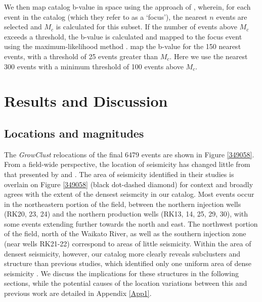 We then map catalog b-value in space using the approach of \citet{Bachmann_2012}, wherein, for each event in the catalog (which they refer to as a `focus'), the nearest $n$ events are selected and $M_c$ is calculated for this subset. If the number of events above $M_c$ exceeds a threshold, the b-value is calculated and mapped to the focus event using the maximum-likelihood method \citep{aki1965maximum,shi1982standard}. \citet{Bachmann_2012} map the b-value for the 150 nearest events, with a threshold of 25 events greater than $M_c$. Here we use the nearest 300 events with a minimum threshold of 100 events above $M_c$.

\section{Results and Discussion}
\subsection{Locations and magnitudes}
The \textit{GrowClust} relocations of the final 6479 events are shown in Figure \ref{349058}. From a field-wide perspective, the location of seismicity has changed little from that presented by \citet{Sherburn_2015} and \citep{Sewell_2015WGC}. The area of seismicity identified in their studies is overlain on Figure \ref{349058} (black dot-dashed diamond) for context and broadly agrees with the extent of the densest seismcity in our catalog. Most events occur in the northeastern portion of the field, between the northern injection wells (RK20, 23, 24) and the northern production wells (RK13, 14, 25, 29, 30), with some events extending further towards the north and east. The northwest portion of the field, north of the Waikato River, as well as the southern injection zone (near wells RK21-22) correspond to areas of little seismicity. Within the area of densest seismicity, however, our catalog more clearly reveals subclusters and structure than previous studies, which identified only one uniform area of dense seismicity \citep{Sherburn_2015}. We discuss the implications for these structures in the following sections, while the potential causes of the location variations between this and previous work are detailed in Appendix \ref{App1}.

